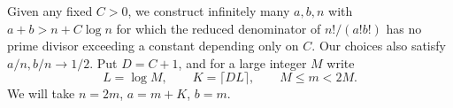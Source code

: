 Given any fixed $C>0$, we construct infinitely many $a,b,n$ with
$a+b>n+C\log n$ for which the reduced denominator of $n!/(a!b!)$ has no prime divisor exceeding a constant depending only on $C$. Our choices also satisfy $a/n,b/n\to1/2$.
Put $D=C+1$, and for a large integer $M$ write
\[
 L=\log M,\qquad K=\lceil DL\rceil,\qquad M\leq m<2M.
\]
We will take $n=2m$, $a=m+K$, $b=m$.
